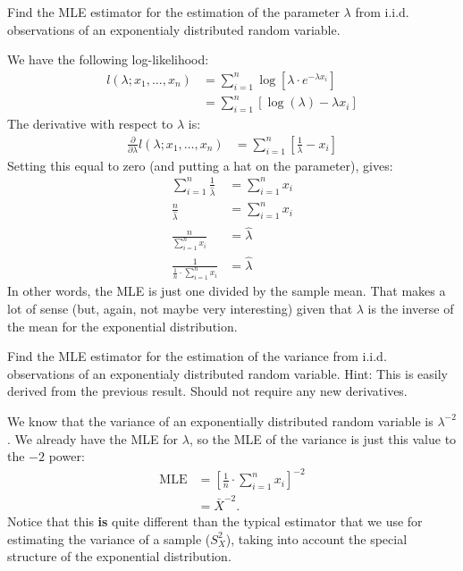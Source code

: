 
Find the MLE estimator for the estimation of the parameter $\lambda$ from
i.i.d. observations of an exponentialy distributed random variable.


We have the following log-likelihood:
\begin{align*}
l(\lambda; x_1, \ldots, x_n) &= \sum_{i=1}^n \log\left[ \lambda \cdot e^{-\lambda x_i} \right] \\
&= \sum_{i=1}^n \left[\log(\lambda) - \lambda x_i \right]
\end{align*}
The derivative with respect to $\lambda$ is:
\begin{align*}
\frac{\partial}{\partial \lambda} l(\lambda; x_1, \ldots, x_n)
&= \sum_{i=1}^n \left[ \frac{1}{\lambda} - x_i \right] 
\end{align*}
Setting this equal to zero (and putting a hat on the parameter), gives:
\begin{align*}
\sum_{i=1}^n \frac{1}{\hat{\lambda}} &= \sum_{i=1}^n x_i \\
\frac{n}{\hat{\lambda}} &= \sum_{i=1}^n x_i \\
\frac{n}{\sum_{i=1}^n x_i} &= \hat{\lambda} \\
\frac{1}{\frac{1}{n} \cdot \sum_{i=1}^n x_i} &= \hat{\lambda} 
\end{align*}
In other words, the MLE is just one divided by the sample mean. That makes
a lot of sense (but, again, not maybe very interesting) given that $\lambda$
is the inverse of the mean for the exponential distribution.


Find the MLE estimator for the estimation of the variance from
i.i.d. observations of an exponentialy distributed random variable.
Hint: This is easily derived from the previous result. Should not 
require any new derivatives.


We know that the variance of an exponentially distributed random variable
is $\lambda^{-2}$. We already have the MLE for $\lambda$, so the MLE of the
variance is just this value to the $-2$ power:
\begin{align*}
\text{MLE} &= \left[ \frac{1}{n} \cdot \sum_{i=1}^n x_i \right]^{-2} \\
&= \bar{X}^{-2}.
\end{align*}
Notice that this \textbf{is} quite different than the typical estimator that
we use for estimating the variance of a sample ($S_X^2$), taking into account
the special structure of the exponential distribution.

